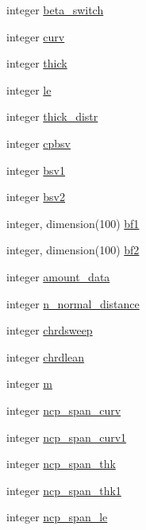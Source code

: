 \begin{DoxyCompactItemize}
integer \hyperlink{namespaceglobvar_ac2f0dd583ec6012e046c832b73410878}{beta\+\_\+switch}
\item 
integer \hyperlink{namespaceglobvar_afae25681092536554c592050d73058fb}{curv}
\item 
integer \hyperlink{namespaceglobvar_afed76bd4905177b5881960ecfcc1e706}{thick}
\item 
integer \hyperlink{namespaceglobvar_acb71a0210b9caf3ad597c781aa0fdbda}{le}
\item 
integer \hyperlink{namespaceglobvar_a025b952856d8a23aaaf7b150c59fd537}{thick\+\_\+distr}
\item 
integer \hyperlink{namespaceglobvar_ad4f4c8cbe26bb1d58d242e5ea327bd8f}{cpbsv}
\item 
integer \hyperlink{namespaceglobvar_af5f7b2251f75b81eeb565207d1b40aab}{bsv1}
\item 
integer \hyperlink{namespaceglobvar_a50c172f04174a319fcbf69991adb2a97}{bsv2}
\item 
integer, dimension(100) \hyperlink{namespaceglobvar_aed39a88b831b27b5b463d57a00a79f88}{bf1}
\item 
integer, dimension(100) \hyperlink{namespaceglobvar_ac00ea6ddd54af474c45fe888882c8a54}{bf2}
\item 
integer \hyperlink{namespaceglobvar_ace5a9b2d41e77ec26c678a7755174bf2}{amount\+\_\+data}
\item 
integer \hyperlink{namespaceglobvar_ae3ba2421a9e1256590002f63d594e18b}{n\+\_\+normal\+\_\+distance}
\item 
integer \hyperlink{namespaceglobvar_a5564253dd9ebb8998b6205940d9419d7}{chrdsweep}
\item 
integer \hyperlink{namespaceglobvar_a227f30590ee8d9741dfbdb6a81b7bbfa}{chrdlean}
\item 
integer \hyperlink{namespaceglobvar_ad09e0e97534b13d507e3e376b768ace2}{m}
\item 
integer \hyperlink{namespaceglobvar_a748fd3a637b62037c6e23eb9b0b8b75e}{ncp\+\_\+span\+\_\+curv}
\item 
integer \hyperlink{namespaceglobvar_a93851f6aad4a96c2042f054b33fb2735}{ncp\+\_\+span\+\_\+curv1}
\item 
integer \hyperlink{namespaceglobvar_ac5be283a8db34f8a815db02152694f0e}{ncp\+\_\+span\+\_\+thk}
\item 
integer \hyperlink{namespaceglobvar_aeb3dab07da1184657a2306f02e490440}{ncp\+\_\+span\+\_\+thk1}
\item 
integer \hyperlink{namespaceglobvar_a644232d8ada9b288e16c29d61dbebf0d}{ncp\+\_\+span\+\_\+le}

\end{DoxyCompactItemize}
